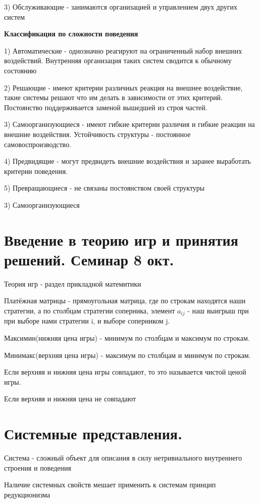 \documentclass[a4paper]{article}
\begin{document}
	3) Обслуживающие - занимаются организацией и управлением двух других систем
	
	\textbf{Классификация по сложности поведения}
	
	1) Автоматические - однозначно реагируют на  ограниченный набор внешних воздействий. Внутренняя организация таких систем сводится к обычному состоянию
	
	2) Решающие - имеют критерии различных реакция на внешнее воздействие, такие системы решают что им делать  в зависимости от этих критерий. Постоянство поддерживается заменой вышедшей из строя частей.
	
	3) Самоорганизующиеся - имеют гибкие критерии различия и гибкие реакции на внешние воздействия. Устойчивость структуры - постоянное самовоспроизводство. 
	
	4) Предвидящие - могут предвидеть внешние воздействия и заранее выработать критерии поведения.
	
	5) Превращающиеся - не связаны постоянством своей структуры 
	
	3) Самоорганизующиеся
	
	\section{Введение в теорию игр и принятия решений. Семинар 8 окт.}
	
	Теория игр - раздел прикладной матемитики
	
	Платёжная матрицы - прямоугольная матрица, где по строкам находятся наши стратегии, а по столбцам стратегии соперника, элемент $ a_{ij} $ - наш выигрыш при при выборе нами стратегии i, и выборе соперником j.
	
	Максимин(нижняя цена игры) - минимум по столбцам и максимум по строкам.
	
	Минимакс(верхняя цена игры) - максимум по столбцам и минимум по строкам.
	
	Если верхняя и нижняя цена игры совпадают, то это называется чистой ценой игры.
	
	Если верхняя и нижняя цена не совпадают
	
	\section{Системные представления.}
	
	Система - сложный объект для описания в силу нетривиального внутреннего строения и поведения
	
	Наличие системных свойств мешает применить к системам принцип редукционизма
	
\end{document}
